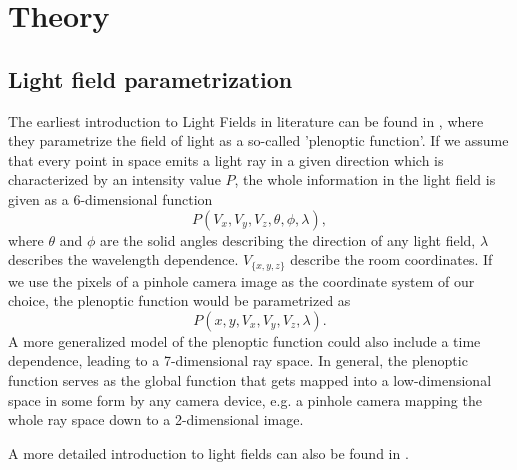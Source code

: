 \documentclass  [
  paper    = a4,
  BCOR     = 10mm,
  twoside,
  fontsize = 12pt,
  fleqn,
  toc      = bibnumbered,
  toc      = listofnumbered,
  numbers  = noendperiod,
  headings = normal,
  listof   = leveldown,
  version  = 3.03
]                                       {scrreprt}
\begin{document}
\chapter{Theory}
\section{Light field parametrization}
The earliest introduction to Light Fields in literature can be found in \cite{adelson1991plenoptic}, where they parametrize the field of light as a  so-called 'plenoptic function'. If we assume that every point in space emits a light ray  in a given direction which is characterized by an intensity value $P$, the whole information in the light field is given as a 6-dimensional function
\begin{equation}\label{key}
P(V_x,V_y, V_z, \theta, \phi, \lambda),
\end{equation}
where $\theta$ and $\phi$ are the solid angles describing the direction of any light field, $\lambda$ describes the wavelength dependence. $V_{\{x,y,z\}}$ describe the room coordinates. If we use the pixels of a pinhole camera image as the coordinate system of our choice, the plenoptic function would be parametrized as 
\begin{equation}\label{eq:plenoptic}
P(x,y, V_x, V_y, V_z, \lambda).
\end{equation}
 A more generalized model of the plenoptic function could also include a time dependence, leading to a 7-dimensional ray space. In general, the plenoptic function serves as the global function that gets mapped into a low-dimensional space in some form by any camera device, e.g. a pinhole camera mapping the whole ray space down to a 2-dimensional image.\\
 	
 A more detailed introduction to light fields can also be found in \cite{wanner2014orientation}. 
\end{document}
